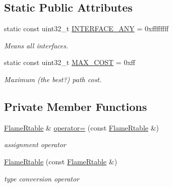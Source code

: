 \subsection*{Static Public Attributes}
\begin{DoxyCompactItemize}
\item 
static const uint32\+\_\+t \hyperlink{classns3_1_1flame_1_1FlameRtable_a355b8bbdfec725bb9ccfddc8f3302573}{I\+N\+T\+E\+R\+F\+A\+C\+E\+\_\+\+A\+NY} = 0xffffffff
\begin{DoxyCompactList}\small\item\em Means all interfaces. \end{DoxyCompactList}\item 
static const uint32\+\_\+t \hyperlink{classns3_1_1flame_1_1FlameRtable_abc65618c03b34257555012ddab0bbf36}{M\+A\+X\+\_\+\+C\+O\+ST} = 0xff
\begin{DoxyCompactList}\small\item\em Maximum (the best?) path cost. \end{DoxyCompactList}\end{DoxyCompactItemize}
\subsection*{Private Member Functions}
\begin{DoxyCompactItemize}
\item 
\hyperlink{classns3_1_1flame_1_1FlameRtable}{Flame\+Rtable} \& \hyperlink{classns3_1_1flame_1_1FlameRtable_a181d9ead174a500355b57e474eb64f93}{operator=} (const \hyperlink{classns3_1_1flame_1_1FlameRtable}{Flame\+Rtable} \&)
\begin{DoxyCompactList}\small\item\em assignment operator \end{DoxyCompactList}\item 
\hyperlink{classns3_1_1flame_1_1FlameRtable_ae8b35203557dc85780483c62c74de4ac}{Flame\+Rtable} (const \hyperlink{classns3_1_1flame_1_1FlameRtable}{Flame\+Rtable} \&)
\begin{DoxyCompactList}\small\item\em type conversion operator \end{DoxyCompactList}\end{DoxyCompactItemize}
